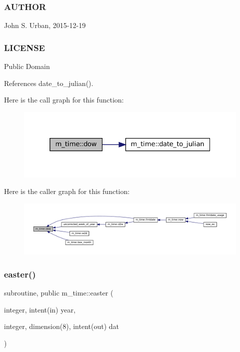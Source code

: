  \subsubsection*{A\+U\+T\+H\+OR}

John S. Urban, 2015-\/12-\/19 \subsubsection*{L\+I\+C\+E\+N\+SE}

Public Domain 

References date\+\_\+to\+\_\+julian().

Here is the call graph for this function\+:\nopagebreak
\begin{figure}[H]
\begin{center}
\leavevmode
\includegraphics[width=325pt]{namespacem__time_adfda8a89820b8d0ad4581a14896e4ce5_cgraph}
\end{center}
\end{figure}
Here is the caller graph for this function\+:
\nopagebreak
\begin{figure}[H]
\begin{center}
\leavevmode
\includegraphics[width=350pt]{namespacem__time_adfda8a89820b8d0ad4581a14896e4ce5_icgraph}
\end{center}
\end{figure}
\mbox{\label{namespacem__time_a5ccb70e20160fcf26bb403dbff1f138a}} 
\subsubsection{\texorpdfstring{easter()}{easter()}}
{\footnotesize\ttfamily subroutine, public m\+\_\+time\+::easter (\begin{DoxyParamCaption}\item[{integer, intent(in)}]{year,  }\item[{integer, dimension(8), intent(out)}]{dat }\end{DoxyParamCaption})}



